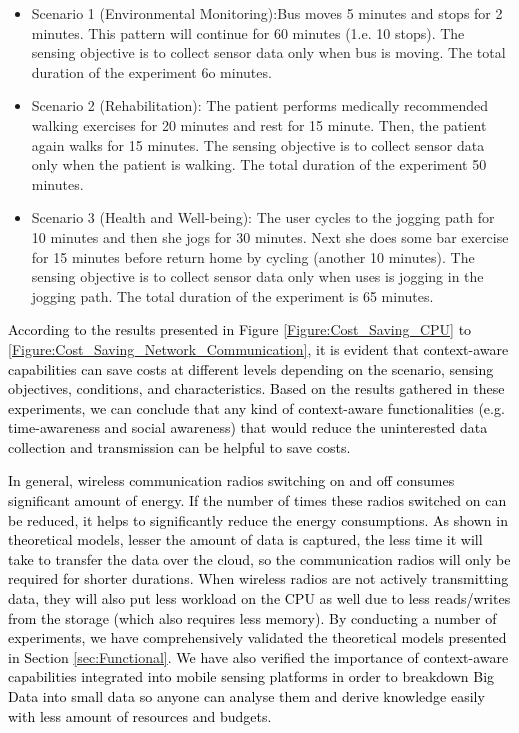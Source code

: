 \documentclass[journal]{IEEEtran}
\begin{document}
\begin{itemize}
\item Scenario 1 (Environmental Monitoring):Bus moves 5 minutes and stops for 2 minutes. This pattern will continue for 60 minutes (1.e. 10 stops). The sensing objective is to collect sensor data only when bus is moving. The total duration of the experiment 6o minutes.

\item Scenario 2 (Rehabilitation): The patient performs medically recommended walking exercises for 20 minutes and rest for 15 minute. Then, the patient again walks for 15 minutes. The sensing objective is to collect sensor data only when the patient is walking. The total duration of the experiment 50 minutes.


\item Scenario 3 (Health and Well-being): The user cycles to the jogging path for 10 minutes and then she jogs for 30 minutes. Next she does some bar exercise for 15 minutes before return home by cycling (another 10 minutes). The sensing objective is to collect sensor data only when uses is jogging in the jogging path. The total duration of the experiment is 65 minutes.
\end{itemize}


\textcolor{black}{According to the results presented in Figure \ref{Figure:Cost_Saving_CPU} to \ref{Figure:Cost_Saving_Network_Communication}, it is evident that context-aware capabilities can save costs at different levels depending on the scenario, sensing objectives, conditions, and characteristics. Based on the results gathered in these experiments, we can  conclude that any kind of context-aware functionalities (e.g. time-awareness and social awareness) that would reduce the uninterested data collection and transmission can be helpful to save costs. }


\textcolor{black}{In general, wireless communication radios switching on and off consumes significant amount of energy. If the number of times these radios switched on can be reduced, it helps to significantly  reduce the energy consumptions. As shown in theoretical models, lesser the amount of data is captured, the less time it will take to transfer the data over the cloud, so the communication radios will only be required for shorter durations. When wireless radios are not actively transmitting data, they will also put less workload on the CPU as well due to less reads/writes from the storage (which also requires less memory). By conducting a number of experiments, we have comprehensively validated the theoretical models presented in Section \ref{sec:Functional}. We have also verified the importance of context-aware capabilities integrated into mobile sensing platforms in order to breakdown Big Data into small data so anyone can analyse them and derive knowledge  easily with less amount of resources and budgets.}
\end{document}

